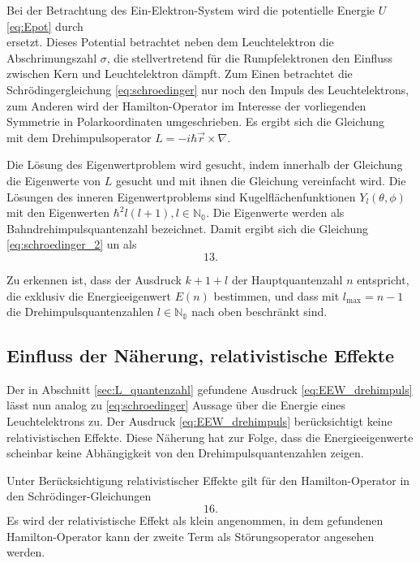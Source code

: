 Bei der Betrachtung des Ein-Elektron-System wird die potentielle Energie $U$ \eqref{eq:Epot} durch
\begin{equation}
	\label{eq:Epot_neu}
\end{equation}
ersetzt.
Dieses Potential betrachtet neben dem Leuchtelektron die Abschrimungszahl $\sigma$, die stellvertretend für die Rumpfelektronen den Einfluss zwischen Kern und Leuchtelektron dämpft.
Zum Einen betrachtet die Schrödingergleichung \eqref{eq:schroedinger} nur noch den Impuls des Leuchtelektrons, zum Anderen wird der Hamilton-Operator im Interesse der vorliegenden Symmetrie in Polarkoordinaten umgeschrieben.
Es ergibt sich die Gleichung
\begin{equation}
	\label{eq:schroedinger_2}
\end{equation}
mit dem Drehimpulsoperator $L=-i\hbar\vec{r}\times\nabla$.

Die Lösung des Eigenwertproblem wird gesucht, indem innerhalb der Gleichung die Eigenwerte von $L$ gesucht und mit ihnen die Gleichung vereinfacht wird.
Die Lösungen des inneren Eigenwertproblems sind Kugelflächenfunktionen $Y_l(\theta,\phi)$ mit den Eigenwerten $\hbar^2 l(l+1), l\in\mathbb{N_0}$.
Die Eigenwerte werden als Bahndrehimpulsquantenzahl bezeichnet.
Damit ergibt sich die Gleichung \eqref{eq:schroedinger_2} un als
\begin{equation}
	13.
	\label{eq:EEW_drehimpuls}
\end{equation}

Zu erkennen ist, dass der Ausdruck $k+1+l$ der Hauptquantenzahl $n$ entspricht, die exklusiv die Energieeigenwert $E(n)$ bestimmen, und dass mit $l_\text{max}=n-1$ die Drehimpulsquantenzahlen $l\in\mathbb{N_0}$ nach oben beschränkt sind.

\subsection{Einfluss der Näherung, relativistische Effekte} %
\label{sub:rel}
Der in Abschnitt \ref{sec:L_quantenzahl} gefundene Ausdruck \eqref{eq:EEW_drehimpuls} lässt nun analog zu \eqref{eq:schroedinger} Aussage über die Energie eines Leuchtelektrons zu.
Der Ausdruck \eqref{eq:EEW_drehimpuls} berücksichtigt keine relativistischen Effekte.
Diese Näherung hat zur Folge, dass die Energieeigenwerte scheinbar keine Abhängigkeit von den Drehimpulsquantenzahlen zeigen.

Unter Berücksichtigung relativistischer Effekte gilt für den Hamilton-Operator in den Schrödinger-Gleichungen
\begin{equation}
	16.
	\label{eq:relativerhamilton}
\end{equation}
Es wird der relativistische Effekt als klein angenommen, in dem gefundenen Hamilton-Operator kann der zweite Term als Störungsoperator angesehen werden.

